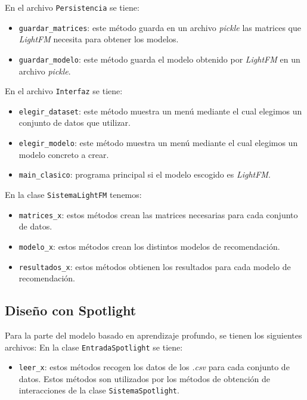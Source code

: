 En el archivo \texttt{Persistencia} se tiene:
\begin{itemize}
\tightlist
\item \texttt{guardar\_matrices}: este método guarda en un archivo \textit{pickle} las matrices que \textit{LightFM} necesita para obtener los modelos.
\item \texttt{guardar\_modelo}: este método guarda el modelo obtenido por \textit{LightFM} en un archivo \textit{pickle}.
\end{itemize}

En el archivo \texttt{Interfaz} se tiene:
\begin{itemize}
\tightlist
\item \texttt{elegir\_dataset}: este método muestra un menú mediante el cual elegimos un conjunto de datos que utilizar.
\item \texttt{elegir\_modelo}: este método muestra un menú mediante el cual elegimos un modelo concreto a crear. 
\item \texttt{main\_clasico}: programa principal si el modelo escogido es \textit{LightFM}. 
\end{itemize}

En la clase \texttt{SistemaLightFM} tenemos:
\begin{itemize}
\tightlist
\item \texttt{matrices\_x}: estos métodos crean las matrices necesarias para cada conjunto de datos. 
\item \texttt{modelo\_x}: estos métodos crean los distintos modelos de recomendación. 
\item \texttt{resultados\_x}: estos métodos obtienen los resultados para cada modelo de recomendación. 
\end{itemize}

\subsection{Diseño con Spotlight}\label{diseño-spotlight}
Para la parte del modelo basado en aprendizaje profundo, se tienen los siguientes archivos:
En la clase \texttt{EntradaSpotlight} se tiene:
\begin{itemize}
\tightlist
\item \texttt{leer\_x}: estos métodos recogen los datos de los \textit{.csv} para cada conjunto de datos. Estos métodos son utilizados por los métodos de obtención de interacciones de la clase \texttt{SistemaSpotlight}.
\end{itemize}

